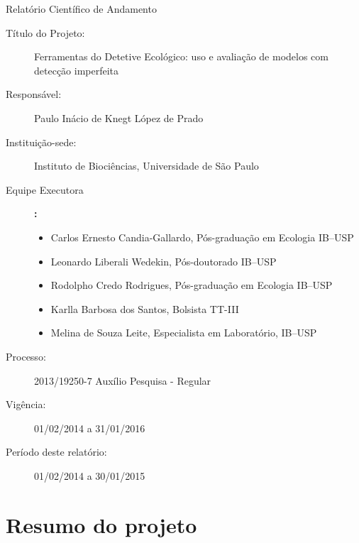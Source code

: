 \documentclass[12pt, A4]{article}
\begin{document}
\pagestyle{fancyplain}
\rhead[\fancyplain{}{\textsl{\thepage}}]%
      {\fancyplain{}{\textsl{\thepage}}}
\lfoot[]{}
\cfoot[]{}
\thispagestyle{empty}
\begin{center}
  {\LARGE Relatório Científico de Andamento} 
\end{center}
\begin{description}
\item[Título do Projeto:] Ferramentas do Detetive Ecológico: uso e avaliação de modelos com detecção imperfeita
\item[Responsável:] Paulo Inácio de Knegt López de Prado
\item[Instituição-sede:] Instituto de Biociências, Universidade de São Paulo
\item[Equipe Executora]{\bf:}
  \begin{itemize}
  \item Carlos Ernesto Candia-Gallardo, Pós-graduação em Ecologia IB--USP
  \item Leonardo Liberali Wedekin, Pós-doutorado IB--USP
  \item Rodolpho Credo Rodrigues, Pós-graduação em Ecologia IB--USP
  \item Karlla Barbosa dos Santos, Bolsista TT-III
  \item Melina de Souza Leite, Especialista em Laboratório, IB--USP
  \end{itemize}
\item[Processo:] 2013/19250-7 Auxílio Pesquisa - Regular 
\item[Vigência:] 01/02/2014 a 31/01/2016 
\item[Período deste relatório:] 01/02/2014 a 30/01/2015
\end{description}

\section{Resumo do projeto}
\end{document}
